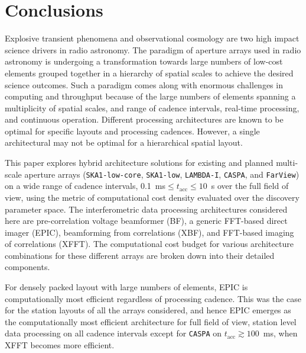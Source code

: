 \documentclass[
  journal=pasa,
  manuscript=article-type,
  year=2020,
  volume=37,
]{cup-journal}
\begin{document}
\section{Conclusions} \label{sec:conclusion}

Explosive transient phenomena and observational cosmology are two high impact science drivers in radio astronomy. The paradigm of aperture arrays used in radio astronomy is undergoing a transformation towards large numbers of low-cost elements grouped together in a hierarchy of spatial scales to achieve the desired science outcomes. Such a paradigm comes along with enormous challenges in computing and throughput because of the large numbers of elements spanning a multiplicity of spatial scales, and range of cadence intervals, real-time processing, and continuous operation. Different processing architectures are known to be optimal for specific layouts and processing cadences. However, a single architectural may not be optimal for a hierarchical spatial layout.

This paper explores hybrid architecture solutions for existing and planned multi-scale aperture arrays (\texttt{SKA1-low-core}, \texttt{SKA1-low}, \texttt{LAMBDA-I}, \texttt{CASPA}, and \texttt{FarView}) on a wide range of cadence intervals, 0.1~ms$\le t_\textrm{acc} \le 10$~s over the full field of view, using the metric of computational cost density evaluated over the discovery parameter space. The interferometric data processing architectures considered here are pre-correlation voltage beamformer (BF), a generic FFT-based direct imager (EPIC), beamforming from correlations (XBF), and FFT-based imaging of correlations (XFFT). The computational cost budget for various architecture combinations for these different arrays are broken down into their detailed components. 

For densely packed layout with large numbers of elements, EPIC is computationally most efficient regardless of processing cadence. This was the case for the station layouts of all the arrays considered, and hence EPIC emerges as the computationally most efficient architecture for full field of view, station level data processing on all cadence intervals except for \texttt{CASPA} on $t_\textrm{acc}\gtrsim 100$~ms, when XFFT becomes more efficient. 
\end{document}
